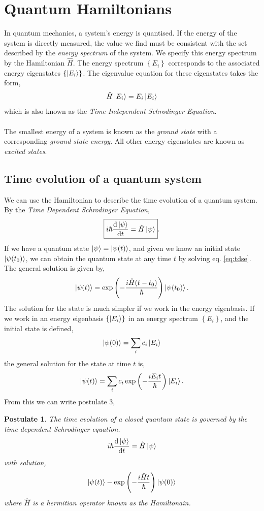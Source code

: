 \documentclass{book}
\newtheorem{postulate}{\textbf{Postulate}}
\begin{document}
\section{Quantum Hamiltonians}
In quantum mechanics, a system's energy is quantised. If the energy of the system is directly measured, the value we find must be consistent with the set described by the \textit{energy spectrum} of the system. We specify this energy spectrum by the Hamiltonian $\hat{H}$. The energy spectrum $\left\{E_i\right\}$ corresponds to the associated energy eigenstates $\left\{\ket{E_i}\right\}$. The eigenvalue equation for these eigenstates takes the form,
\begin{equation}
	\hat{H}\ket{E_i} = E_i\ket{E_i}
\end{equation}
which is also known as the \textit{Time-Independent Schrodinger Equation}.
\\\\
The smallest energy of a system is known as the \textit{ground state} with a corresponding \textit{ground state energy}. All other energy eigenstates are known as \textit{excited states}.
\subsection{Time evolution of a quantum system}
We can use the Hamiltonian to describe the time evolution of a quantum system. By the \textit{Time Dependent Schrodinger Equation},
\begin{equation}
	\boxed{i\hbar \dv{\ket{\psi}}{t} = \hat{H}\ket{\psi}}. \label{eq:tdse}
\end{equation}
If we have a quantum state $\ket{\psi} = \ket{\psi(t)}$, and given we know an initial state $\ket{\psi(t_0)}$, we can obtain the quantum state at any time $t$ by solving  eq. \eqref{eq:tdse}. The general solution is given by,
\begin{equation}
	\ket{\psi(t)} = \exp\left(-\frac{i\hat{H}(t - t_0)}{\hbar}\right)\ket{\psi(t_0)}.
\end{equation}
The solution for the state is much simpler if we work in the energy eigenbasis. If we work in an energy eigenbasis $\left\{\ket{E_i}\right\}$ in an energy spectrum $\left\{E_i\right\}$, and the initial state is defined,
\begin{equation}
	\ket{\psi(0)} = \sum_i c_i\ket{E_i}
\end{equation}
the general solution for the state at time $t$ is,
\begin{equation}
	\ket{\psi(t)} = \sum_ic_i\exp\left(-\frac{iE_it}{\hbar}\right)\ket{E_i}.
\end{equation}
From this we can write postulate 3,
\begin{postulate}
	The time evolution of a closed quantum state is governed by the time dependent Schrodinger equation.
	\begin{equation}
		i\hbar \dv{\ket{\psi}}{t} = \hat{H}\ket{\psi}
	\end{equation}
	with solution,
	\begin{equation}
		\ket{\psi(t)} - \exp\left(-\frac{i\hat{H}t}{\hbar}\right)\ket{\psi(0)}
	\end{equation}
	where $\hat{H}$ is a hermitian operator known as the Hamiltonain.
\end{postulate}
\end{document}
